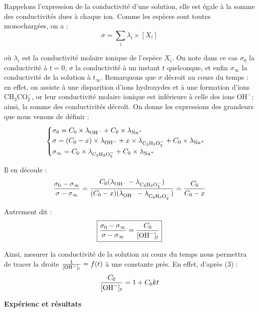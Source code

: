 \documentclass[14pt]{article}
\begin{document}
  Rappelons l'expression de la conductivité d'une solution, elle est égale à la somme des conductivités dues à chaque ion. Comme les espèces sont toutes monochargées, on a :
  \[
    \boxed{\sigma=\sum_i \lambda_i\times[X_i]}
  \]

  où \(\lambda_{i}\) est la conductivité molaire ionique de l'espèce \(X_{i}\). On note dans ce cas \(\sigma_{0}\) la conductivité à \(t=0\), \(\sigma\) la conductivité à un instant \(t\) quelconque, et enfin \(\sigma_{\infty}\) la conductivité de la solution à \(t_{\infty}\). Remarquons que $\sigma$ décroit au cours du temps : en effet, on assiste à une disparition d'ions hydroxydes et à une formation d'ions $\text{CH}_3\text{CO}_\text{2}^-$, or leur conductivité molaire ionique est inférieure à celle des ions $\text{OH}^-$; ainsi, la somme des conductivités décroît. On donne les expressions des grandeurs que nous venons de définir :
  \begin{gather}
    \begin{cases}
      \sigma_0= C_0\times \lambda_{\text{OH}^-}+C_0\times \lambda_{\text{Na}^+}\\
      \sigma = (C_0-x)\times \lambda_{\text{OH}^-} + x\times\lambda_{\text{C}_{\text{2}}\text{H}_{\text{3}}\text{O}_{\text{2}}^-}+C_0\times \lambda_{\text{Na}^+}\\
      \sigma_\infty = C_0\times \lambda_{\text{C}_{\text{2}}\text{H}_{\text{3}}\text{O}_{\text{2}}^-}+C_0\times \lambda_{\text{Na}^+}
    \end{cases}
  \end{gather}

  Il en découle :
  \[
    \frac{\sigma_0-\sigma_\infty}{\sigma-\sigma_\infty}=\frac{C_0(\lambda_{\text{OH}^-}-\lambda_{\text{C}_{\text{2}}\text{H}_{\text{3}}\text{O}_{\text{2}}^-})}{(C_0-x)(\lambda_{\text{OH}^-}-\lambda_{\text{C}_{\text{2}}\text{H}_{\text{3}}\text{O}_{\text{2}}^-})}=\frac{C_0}{C_0-x}
  \]

  Autrement dit :
  \begin{equation}
    \boxed{\frac{\sigma_0-\sigma_\infty}{\sigma-\sigma_\infty}=\frac{C_0}{[\text{OH}^-]_t}}
  \end{equation}

  Ainsi, mesurer la conductivité de la solution au cours du temps nous permettra de tracer la droite $\frac{1}{[\text{OH}^-]_t}=f(t)$ à une constante près. En effet, d'après (3) :
  \begin{equation}
    \frac{C_0}{[\text{OH}^-]_t}=1+C_0kt
  \end{equation}



  \begin{center}
		\textbf{\Large Expérienc et résultats}
	\end{center}

  \vspace{4mm}
\end{document}
